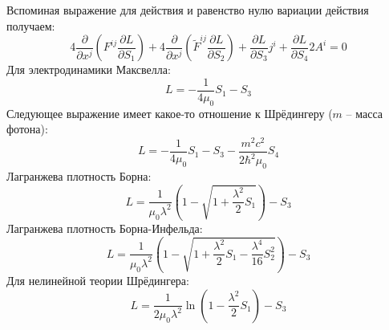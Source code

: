Вспоминая выражение для действия и равенство нулю вариации действия получаем:
\[
	4 \frac{\partial}{\partial x^j} \left(F^{ij} \frac{\partial L}{\partial S_1} \right) + 
	4 \frac{\partial}{\partial x^j} \left(\tilde{F}^{ij} \frac{\partial L}{\partial S_2} \right) +
	\frac{\partial L}{\partial S_3} j^i + 
	\frac{\partial L}{\partial S_4} 2 A^i = 0
\]
Для электродинамики Максвелла:
\[
	L = - \frac{1}{4\mu_0} S_1 - S_3
\]
Следующее выражение имеет какое-то отношение к Шрёдингеру ($m$ -- масса фотона):
\[
	L = - \frac{1}{4\mu_0} S_1 - S_3 - \frac{m^2 c^2}{2 \hbar^2 \mu_0} S_4
\]
Лагранжева плотность Борна:
\[
	L = \frac{1}{\mu_0 \lambda^2} \left( 1 - \sqrt{1 + \frac{\lambda^2}{2}  S_1} \right) - S_3
\]
Лагранжева плотность Борна-Инфельда:
\[
	L = \frac{1}{\mu_0 \lambda^2} \left( 1 - \sqrt{1 + \frac{\lambda^2}{2}  S_1 - \frac{\lambda^4}{16}  S_2^2} \right) - S_3
\]
Для нелинейной теории Шрёдингера:
\[
	L = \frac{1}{2 \mu_0 \lambda^2} \ln \left(1 - \frac{\lambda^2}{2} S_1\right) - S_3
\]
